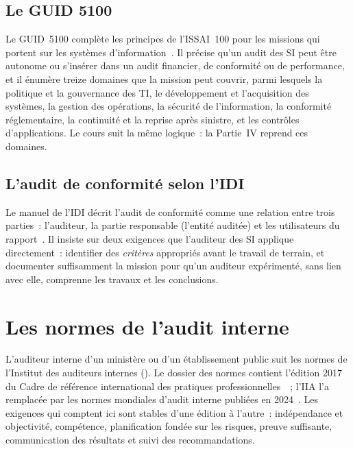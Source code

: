 \subsection{Le GUID 5100}

Le GUID~5100 complète les principes de l'ISSAI~100 pour les missions qui
portent sur les systèmes d'information~\cite{intosai2019guid5100}. Il
précise qu'un audit des SI peut être autonome ou s'insérer dans un audit
financier, de conformité ou de performance, et il énumère treize domaines
que la mission peut couvrir, parmi lesquels la politique et la
gouvernance des TI, le développement et l'acquisition des systèmes, la
gestion des opérations, la sécurité de l'information, la conformité
réglementaire, la continuité et la reprise après sinistre, et les
contrôles d'applications. Le cours suit la même logique~:
la Partie~IV reprend ces domaines.

\subsection{L'audit de conformité selon l'IDI}

Le manuel de l'IDI décrit l'audit de conformité comme une relation entre
trois parties~: l'auditeur, la partie responsable (l'entité auditée) et
les utilisateurs du rapport~\cite{idi2021conformite}. Il insiste sur deux
exigences que l'auditeur des SI applique directement~: identifier des
\emph{critères} appropriés avant le travail de terrain, et documenter
suffisamment la mission pour qu'un auditeur expérimenté, sans lien avec
elle, comprenne les travaux et les conclusions.

\separateur

\section{Les normes de l'audit interne}
\label{sec:c05-iia}

L'auditeur interne d'un ministère ou d'un établissement public suit les
normes de l'Institut des auditeurs internes (). Le dossier des
normes contient l'édition 2017 du Cadre de référence international des
pratiques professionnelles~\cite{iia2017cripp}~; l'IIA l'a remplacée par
les normes mondiales d'audit interne publiées en
2024~\cite{iia2024gias}. Les exigences qui comptent ici sont stables
d'une édition à l'autre~: indépendance et objectivité, compétence,
planification fondée sur les risques, preuve suffisante, communication
des résultats et suivi des recommandations.

